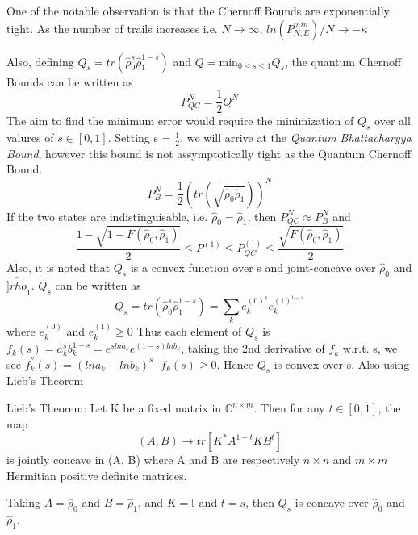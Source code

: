One of the notable observation is that the Chernoff Bounds are exponentially tight. As the number of trails increases i.e. $N \rightarrow \infty$, $ln(P_{N,E}^{min})/N \rightarrow -\kappa$

Also, defining $Q_s = tr(\hat{\rho}_0^s \hat{\rho}_1^{1-s})$ and $Q = \text{min}_{0 \le s \le 1} Q_s$, the quantum Chernoff Bounds can be written as
\begin{equation}
    P_{QC}^N = \frac{1}{2}Q^N
\end{equation}
The aim to find the minimum error would require the minimization of $Q_s$ over all valures of $s \in [0, 1]$. Setting s = $\frac{1}{2}$, we will arrive at the \textit{Quantum Bhattacharyya Bound}, however this bound is not assymptotically tight as the Quantum Chernoff Bound.
\begin{equation}
    P_{B}^N = \frac{1}{2}\left(tr(\sqrt{\hat{\rho}_0 \hat{\rho}_1})\right)^N
\end{equation}
If the two states are indistinguisable, i.e. $\hat{\rho}_0 = \hat{\rho}_1$, then $P_{QC}^N \approx P_B^N$ and 
\begin{equation}
\frac{1 - \sqrt{1 - F(\hat{\rho}_0, \hat{\rho}_1)}}{2} \le P^{(1)} \le P_{QC}^{(1)} \le \frac{\sqrt{F(\hat{\rho}_0, \hat{\rho}_1)}}{2}
\label{eq:ineq}
\end{equation}
Also, it is noted that $Q_s$ is a convex function over s and joint-concave over $\hat{\rho}_0$ and $\hat{]rho}_1$. 
$Q_s$ can be written as $$Q_s = tr(\hat{\rho}_0^s \hat{\rho}_1^{1 - s}) = \sum_k e_k^{(0)^s} e_k^{(1)^{1 - s}}$$
where $e_k^{(0)}$ and $e_k^{(1)} \ge 0$
Thus each element of $Q_s$ is $f_k(s) = a_k^s b_k^{1 - s} = e^{s ln{a_k}} e^{(1 - s) ln{b_k}}$, taking the 2nd derivative of $f_k$ w.r.t. s, we see $f_k^{''}(s) = (ln a_k - ln b_k)^s \cdot f_k(s) \ge 0$. Hence $Q_s$ is convex over s. 
Also using Lieb's Theorem \cite{libstheorem}
\begin{theorem}
    Lieb's Theorem: Let K be a fixed matrix in $\mathbb{C}^{n\times m}$. Then for any $t \in [0, 1]$, the map $$(A, B) \rightarrow tr[K^* A^{1 - t} K B^t]$$ is jointly concave in (A, B) where A and B are respectively $n \times n$ and $m \times m$ Hermitian positive definite matrices.
\end{theorem}
Taking $A = \hat{\rho}_0$ and $B = \hat{\rho}_1$, and $K = \mathbb{I}$ and $t = s$, then $Q_s$ is concave over $\hat{\rho}_0$ and $\hat{\rho}_1$.
